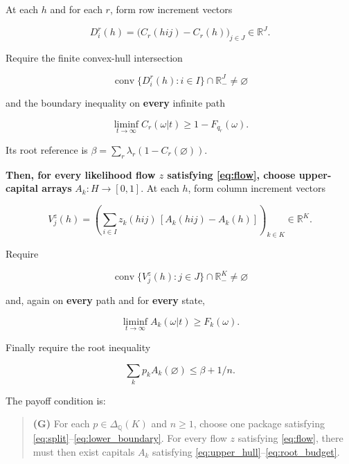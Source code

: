 \documentclass[11pt,a4paper]{article}
\begin{document}
At each \(h\) and for each \(r\), form row increment vectors

\[
D^r_i(h)=\big(C_r(hij)-C_r(h)\big)_{j\in J}\in\mathbb R^J.
\]

Require the finite convex-hull intersection

\begin{equation}
\operatorname{conv}\{D^r_i(h):i\in I\}
 \cap\mathbb R_-^J\ne\varnothing \label{eq:lower_hull}
\end{equation}

and the boundary inequality on \textbf{every} infinite path

\begin{equation}
\liminf_{t\to\infty}C_r(\omega|t)\ge1-F_{q_r}(\omega).
\label{eq:lower_boundary}
\end{equation}

Its root reference is \(\beta=\sum_r\lambda_r(1-C_r(\varnothing))\).

\textbf{Then, for every likelihood flow \(z\) satisfying \eqref{eq:flow}, choose upper-capital arrays} \(A_k:H\to[0,1]\). At each \(h\), form column increment vectors

\[
V^z_j(h)=\left(
 \sum_{i\in I}z_k(hij)\,[A_k(hij)-A_k(h)]
 \right)_{k\in K}\in\mathbb R^K.
\]

Require

\begin{equation}
\operatorname{conv}\{V^z_j(h):j\in J\}
 \cap\mathbb R_-^K\ne\varnothing \label{eq:upper_hull}
\end{equation}

and, again on \textbf{every} path and for \textbf{every} state,

\begin{equation}
\liminf_{t\to\infty}A_k(\omega|t)\ge F_k(\omega).
\label{eq:upper_boundary}
\end{equation}

Finally require the root inequality

\begin{equation}
\sum_kp_kA_k(\varnothing)\le\beta+1/n. \label{eq:root_budget}
\end{equation}

The payoff condition is:

\begin{quote}
\textbf{(G)} For each \(p\in\Delta_{\mathbb Q}(K)\) and \(n\ge1\), choose one
package satisfying \eqref{eq:split}--\eqref{eq:lower_boundary}. For every flow
\(z\) satisfying \eqref{eq:flow}, there must then exist capitals \(A_k\)
satisfying \eqref{eq:upper_hull}--\eqref{eq:root_budget}.
\end{quote}
\end{document}
